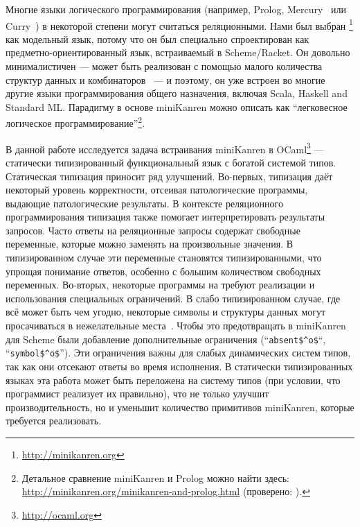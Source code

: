Многие языки логического программирования (например, Prolog, Mercury~\cite{MercuryFirstPaper} или Curry~\cite{CurryFirstPaper}) в некоторой степени могут считаться реляционными.
Нами был выбран \miniKanren\footnote{\url{http://minikanren.org}} как модельный язык, потому что он был специально спроектирован как предметно-ориентированный язык, встраиваемый в Scheme/Racket.
Он довольно минималистичен --- может быть реализован с помощью малого количества структур данных и комбинаторов~\cite{MicroKanren, MuKanrenNew} --- и поэтому, он уже встроен во многие другие языки программирования общего назначения, включая Scala, Haskell and Standard ML.
Парадигму в основе miniKanren можно описать как \enquote{легковесное логическое программирование}\footnote{Детальное сравнение miniKanren и Prolog можно найти здесь: \url{http://minikanren.org/minikanren-and-prolog.html} (проверено: ).}.

В данной работе исследуется задача встраивания miniKanren в OCaml\footnote{\url{http://ocaml.org}} --- статически типизированный функциональный язык с богатой системой типов.
Статическая типизация приносит ряд улучшений.
Во-первых, типизация даёт некоторый уровень корректности, отсеивая патологические программы, выдающие патологические результаты.
В контексте реляционного программирования типизация также помогает интерпретировать результаты запросов.
Часто ответы на реляционные запросы содержат свободные переменные, которые можно заменять на произвольные значения.
В типизированном случае эти переменные становятся типизированными, что упрощая понимание ответов, особенно с большим количеством свободных переменных.
Во-вторых, некоторые программы на \miniKanren{} требуют реализации и использования специальных ограничений.
В слабо типизированном случае, где всё может быть чем угодно, некоторые символы и структуры данных могут просачиваться в нежелательные места~\cite{Untagged}.
Чтобы это предотвращать в miniKanren для Scheme были добавление дополнительные ограничения (``\lstinline|absent$^o$|``, ``\lstinline|symbol$^o$|'').
Эти ограничения важны для слабых динамических систем типов, так как они отсекают ответы во время исполнения.
В статически типизированных языках эта работа может быть переложена на систему типов (при условии, что программист реализует их правильно), что не только улучшит производительность, но и уменьшит количество примитивов miniKanren, которые требуется реализовать.


